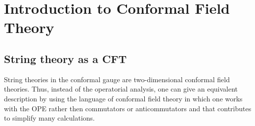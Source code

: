 
\chapter{Introduction to Conformal Field Theory}
\adjustmtc
\minitoc
\section{String theory as a CFT}
\par String theories in the conformal gauge are two-dimensional
conformal field theories. Thus, instead of the operatorial analysis, one can give an equivalent description
by using the language of conformal field theory in which one works with the
OPE rather then commutators or anticommutators and that contributes to
simplify many calculations. 
